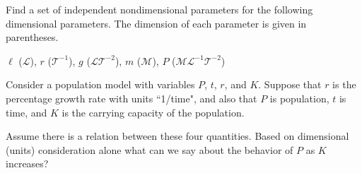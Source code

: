 %
%

\begin{exercises}
\begin{exercise}
\label{ex:Nondim_lrgmP}
Find a set of independent nondimensional parameters for the following
dimensional parameters.  The dimension of each parameter
is given in parentheses.

\centerline{$\ell$ ($\mathcal{L}$), $r$ ($\mathcal{T}^{-1}$),
$g$ ($\mathcal{LT}^{-2}$), $m$ ($\mathcal{M}$),
$P$ ($\mathcal{M}\mathcal{L}^{-1}\mathcal{T}^{-2}$)}
\end{exercise}

\begin{exercise}
Consider a population model with variables 
$P$, $t$, $r$, and $K$.  
Suppose that $r$ is the percentage growth rate with units
``1/time", and also that $P$ is population, $t$ is time, 
and $K$ is the carrying capacity of the population.

Assume there is a relation between these four quantities.  
Based on dimensional (units) consideration alone 
what can we say about the behavior of $P$ as $K$ increases?
\end{exercise}
\end{exercises}

